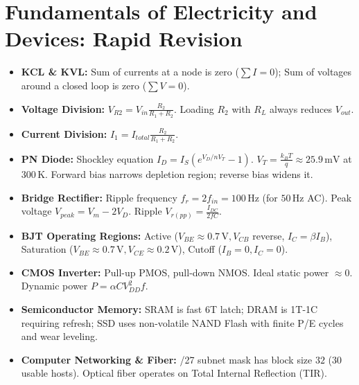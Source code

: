 \chapter{Fundamentals of Electricity and Devices: Rapid Revision}

\begin{highyieldbox}
\begin{itemize}[leftmargin=*]
    \item \textbf{KCL \& KVL:} Sum of currents at a node is zero ($\sum I = 0$); Sum of voltages around a closed loop is zero ($\sum V = 0$).
    \item \textbf{Voltage Division:} $V_{R2} = V_{in}\frac{R_2}{R_1+R_2}$. Loading $R_2$ with $R_L$ always reduces $V_{out}$.
    \item \textbf{Current Division:} $I_1 = I_{total}\frac{R_2}{R_1+R_2}$.
    \item \textbf{PN Diode:} Shockley equation $I_D = I_S(e^{V_D/n V_T} - 1)$. $V_T = \frac{k_B T}{q} \approx 25.9\,\text{mV}$ at $300\,\text{K}$. Forward bias narrows depletion region; reverse bias widens it.
    \item \textbf{Bridge Rectifier:} Ripple frequency $f_r = 2 f_{in} = 100\,\text{Hz}$ (for $50\,\text{Hz}$ AC). Peak voltage $V_{peak} = V_m - 2V_D$. Ripple $V_{r(pp)} = \frac{I_{DC}}{2 f C}$.
    \item \textbf{BJT Operating Regions:} Active ($V_{BE}\approx 0.7\,\text{V}, V_{CB}$ reverse, $I_C = \beta I_B$), Saturation ($V_{BE}\approx 0.7\,\text{V}, V_{CE}\approx 0.2\,\text{V}$), Cutoff ($I_B=0, I_C=0$).
    \item \textbf{CMOS Inverter:} Pull-up PMOS, pull-down NMOS. Ideal static power $\approx 0$. Dynamic power $P = \alpha C V_{DD}^2 f$.
    \item \textbf{Semiconductor Memory:} SRAM is fast 6T latch; DRAM is 1T-1C requiring refresh; SSD uses non-volatile NAND Flash with finite P/E cycles and wear leveling.
    \item \textbf{Computer Networking \& Fiber:} /27 subnet mask has block size $32$ ($30$ usable hosts). Optical fiber operates on Total Internal Reflection (TIR).
\end{itemize}
\end{highyieldbox}
